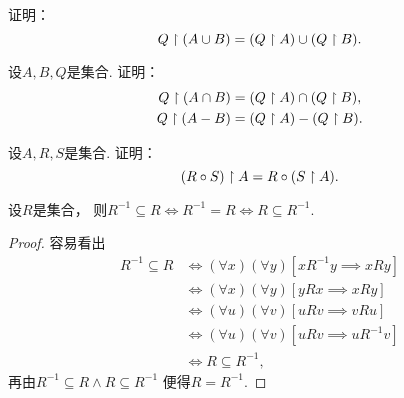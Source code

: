 \begin{example}
证明：\begin{equation}
	Q \upharpoonright (A \cup B)
	= (Q \upharpoonright A)\cup(Q \upharpoonright B).
\end{equation}
\end{example}

\begin{example}
设\(A,B,Q\)是集合.
证明：\begin{gather}
	Q \upharpoonright (A \cap B)
	= (Q \upharpoonright A) \cap (Q \upharpoonright B), \\
	Q \upharpoonright (A - B)
	= (Q \upharpoonright A)
	- (Q \upharpoonright B).
\end{gather}
\end{example}

\begin{example}
设\(A,R,S\)是集合.
证明：\begin{equation}
	(R \circ S) \upharpoonright A = R \circ (S \upharpoonright A).
\end{equation}
\end{example}

\begin{proposition}\label{theorem:集合论.与逆相等的充分必要条件}
设\(R\)是集合，
则\(R^{-1} \subseteq R
\iff R^{-1} = R
\iff R \subseteq R^{-1}\).
\begin{proof}
容易看出\begin{align*}
	R^{-1} \subseteq R
	&\iff
	(\forall x)(\forall y)[xR^{-1}y \implies xRy] \\
	&\iff
	(\forall x)(\forall y)[yRx \implies xRy] \\
	&\iff
	(\forall u)(\forall v)[uRv \implies vRu] \\
	&\iff
	(\forall u)(\forall v)[uRv \implies uR^{-1}v] \\
	&\iff
	R \subseteq R^{-1},
\end{align*}
再由\(R^{-1} \subseteq R \land R \subseteq R^{-1}\)
便得\(R = R^{-1}\).
\end{proof}
\end{proposition}


